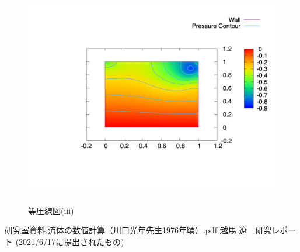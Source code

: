 \documentclass[upLaTeX,a4paper]{jsarticle}
\begin{document}
\begin{figure}[H]
  \centering
  \includegraphics[height=9.5cm]{outputs/img/p_re500.png}
  \caption{等圧線図(iii)}
  \label{fig:p_re500}
\end{figure}

\begin{thebibliography}{9}
   研究室資料.流体の数値計算（川口光年先生1976年頃）.pdf
   越馬 遼　研究レポート (2021/6/17に提出されたもの)
\end{thebibliography}
\end{document}

